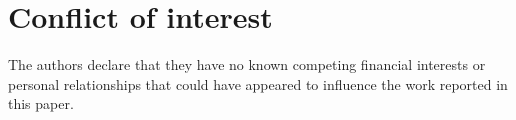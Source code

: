 \section*{Conflict of interest}
The authors declare that they have no known competing financial interests or personal relationships that could have appeared to influence the work reported in this paper.

